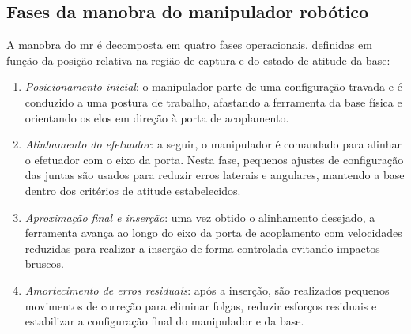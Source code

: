 \subsection{Fases da manobra do manipulador robótico}
\label{sec:fases_manobra_MR}

A manobra do \gls{mr} é decomposta em quatro fases operacionais, definidas em função da posição relativa na região de captura e do estado de atitude da base:

\begin{enumerate}[label=(\roman*)]
\item \textit{Posicionamento inicial}: o manipulador parte de uma configuração travada e é conduzido a uma postura de trabalho, afastando a ferramenta da base física e orientando os elos em direção à porta de acoplamento.

\item \textit{Alinhamento do efetuador}: a seguir, o manipulador é comandado para alinhar o efetuador com o eixo da porta. Nesta fase, pequenos ajustes de configuração das juntas são usados para reduzir erros laterais e angulares, mantendo a base dentro dos critérios de atitude estabelecidos.

\item \textit{Aproximação final e inserção}: uma vez obtido o alinhamento desejado, a ferramenta avança ao longo do eixo da porta de acoplamento com velocidades reduzidas para realizar a inserção de forma controlada evitando impactos bruscos.

\item \textit{Amortecimento de erros residuais}: após a inserção, são realizados pequenos movimentos de correção para eliminar folgas, reduzir esforços residuais e estabilizar a configuração final do manipulador e da base.
\end{enumerate}